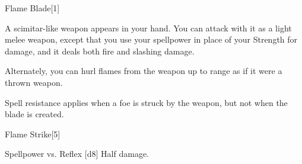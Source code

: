 \begin{spellsection}{Flame Blade}[1]
    \begin{spellheader}
    \end{spellheader}
    \begin{spellcontent}
        \begin{spelleffects}
            \spelleffect A scimitar-like weapon appears in your hand. You can attack with it as a light melee weapon, except that you use your spellpower in place of your Strength for damage, and it deals both fire and slashing damage.

            Alternately, you can hurl flames from the weapon up to \rngmed range as if it were a thrown weapon.
            \spelldur \durmed \dismissable
        \end{spelleffects}
    \end{spellcontent}
    \begin{spellfooter}
        \spellnotes Spell resistance applies when a foe is struck by the weapon, but not when the blade is created.
        \firespellnotes
        \miscastexplode
    \end{spellfooter}
\end{spellsection}

\begin{spellsection}{Flame Strike}[5]
    \begin{spellheader}
    \end{spellheader}
    \begin{spellcontent}
        \begin{spelltargetinginfo}
        \end{spelltargetinginfo}
        \begin{spelleffects}
            \begin{spellattack}{Spellpower vs. Reflex}
                \spellsuccess {}[d8]
                \spellfailure Half damage.
            \end{spellattack}
        \end{spelleffects}
    \end{spellcontent}
    \begin{spellfooter}
        \spellnotes \destructivespellnotes

        \firespellnotes
        \miscastyou
    \end{spellfooter}
\end{spellsection}

